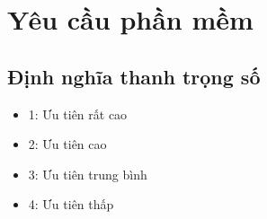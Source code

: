 \documentclass[a4paper, 12pt]{article}
\begin{document}
\clearpage

   \section{Yêu cầu phần mềm}
    \label{sec:requirement}

    \subsection{Định nghĩa thanh trọng số}
    \begin{itemize}
        \item 1: Ưu tiên rất cao 
        \item 2: Ưu tiên cao 
        \item 3: Ưu tiên trung bình 
        \item 4: Ưu tiên thấp 
    \end{itemize}
\end{document}
